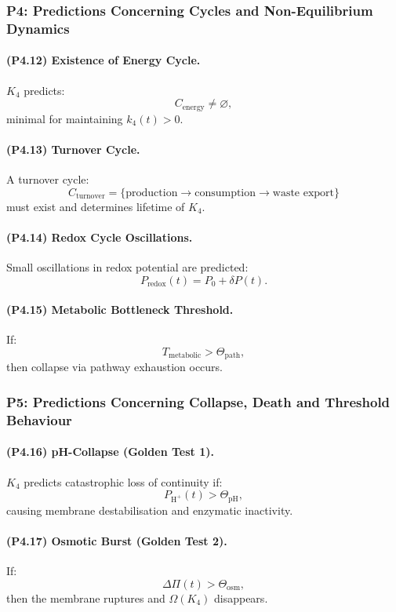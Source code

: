 \subsubsection{P4: Predictions Concerning Cycles and Non-Equilibrium Dynamics}

\paragraph{(P4.12) Existence of Energy Cycle.}
$K_4$ predicts:
\[
C_{\mathrm{energy}} \neq \varnothing,
\]
minimal for maintaining $k_4(t)>0$.

\paragraph{(P4.13) Turnover Cycle.}
A turnover cycle:
\[
C_{\mathrm{turnover}} =
\{\text{production} \to \text{consumption} \to \text{waste export}\}
\]
must exist and determines lifetime of $K_4$.

\paragraph{(P4.14) Redox Cycle Oscillations.}
Small oscillations in redox potential are predicted:
\[
P_{\mathrm{redox}}(t) = P_0 + \delta P(t).
\]

\paragraph{(P4.15) Metabolic Bottleneck Threshold.}
If:
\[
T_{\mathrm{metabolic}} > \Theta_{\mathrm{path}},
\]
then collapse via pathway exhaustion occurs.

\subsubsection{P5: Predictions Concerning Collapse, Death and Threshold Behaviour}

\paragraph{(P4.16) pH-Collapse (Golden Test 1).}
$K_4$ predicts catastrophic loss of continuity if:
\[
P_{\mathrm{H}^+}(t) > \Theta_{\mathrm{pH}},
\]
causing membrane destabilisation and enzymatic inactivity.

\paragraph{(P4.17) Osmotic Burst (Golden Test 2).}
If:
\[
\Delta \Pi(t) > \Theta_{\mathrm{osm}},
\]
then the membrane ruptures and $\Omega(K_4)$ disappears.

